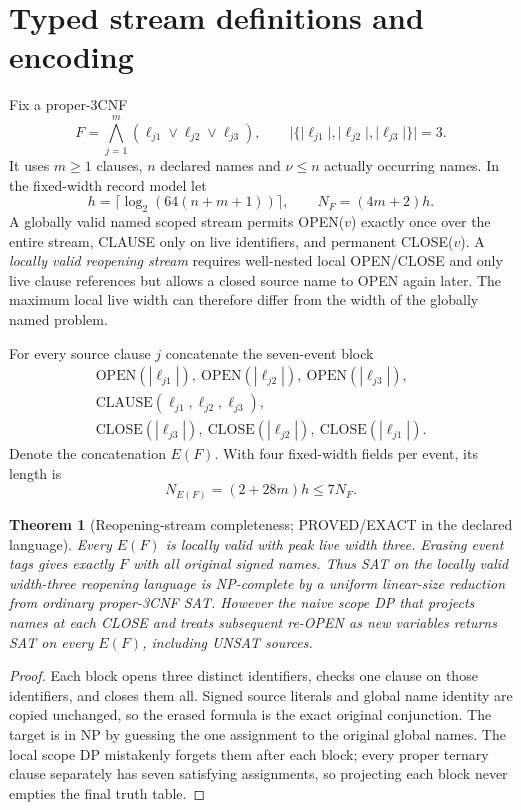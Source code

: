\documentclass[11pt]{article}
\newtheorem{theorem}{Theorem}
\begin{document}
\section{Typed stream definitions and encoding}
Fix a proper-3CNF
\[
F=\bigwedge_{j=1}^{m}
(\ell_{j1}\vee\ell_{j2}\vee\ell_{j3}),\qquad
|\{|\ell_{j1}|,|\ell_{j2}|,|\ell_{j3}|\}|=3.
\]
It uses $m\ge1$ clauses, $n$ declared names and $\nu\le n$
actually occurring names. In the fixed-width record model let
\[
h=\lceil\log_2(64(n+m+1))\rceil,\qquad N_F=(4m+2)h.
\]
A globally valid named scoped stream permits OPEN($v$) exactly once
over the entire stream, CLAUSE only on live identifiers, and permanent
CLOSE($v$). A \emph{locally valid reopening stream} requires
well-nested local OPEN/CLOSE and only live clause references but allows
a closed source name to OPEN again later. The maximum local live width
can therefore differ from the width of the globally named problem.

For every source clause $j$ concatenate the seven-event block
\[
\begin{gathered}
\mathrm{OPEN}(|\ell_{j1}|),\
\mathrm{OPEN}(|\ell_{j2}|),\
\mathrm{OPEN}(|\ell_{j3}|),\\
\mathrm{CLAUSE}(\ell_{j1},\ell_{j2},\ell_{j3}),\\
\mathrm{CLOSE}(|\ell_{j3}|),\
\mathrm{CLOSE}(|\ell_{j2}|),\
\mathrm{CLOSE}(|\ell_{j1}|).
\end{gathered}
\]
Denote the concatenation $E(F)$. With four fixed-width fields per
event, its length is
\[
N_{E(F)}=(2+28m)h\le7N_F.
\]

\begin{theorem}[Reopening-stream completeness; PROVED/EXACT in the declared language]
Every $E(F)$ is locally valid with peak live width three.
Erasing event tags gives exactly $F$ with all original signed names.
Thus SAT on the locally valid width-three reopening language is
NP-complete by a uniform linear-size reduction from ordinary
proper-3CNF SAT. However the naive scope DP that projects names at
each CLOSE and treats subsequent re-OPEN as new variables
returns SAT on \emph{every} $E(F)$, including UNSAT sources.
\end{theorem}
\begin{proof}
Each block opens three distinct identifiers, checks one clause on
those identifiers, and closes them all. Signed source literals and
global name identity are copied unchanged, so the erased formula is
the exact original conjunction. The target is in NP by guessing the
one assignment to the original global names. The local scope DP
mistakenly forgets them after each block; every proper ternary clause
separately has seven satisfying assignments, so projecting each block
never empties the final truth table.
\end{proof}
\end{document}
